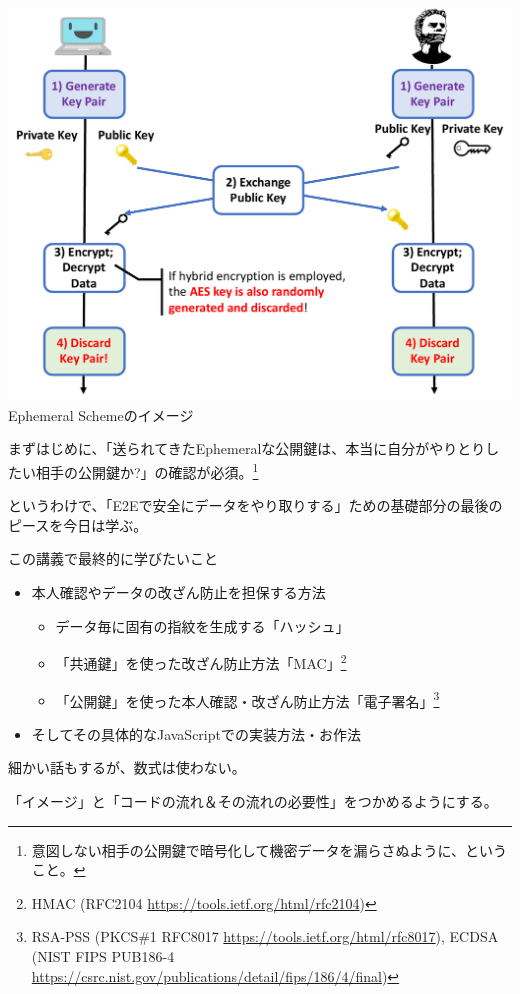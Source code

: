 \documentclass[12pt,dvipdfmx]{beamer}
\begin{document}
\begin{frame}
\small 
\begin{center}
\includegraphics[width=0.7\linewidth]{Figs/ephemeral-scheme-flow01.pdf}\\
Ephemeral Schemeのイメージ
\end{center}
\vspace{-1ex}

まずはじめに、\alert{「送られてきたEphemeralな公開鍵は、本当に自分がやりとりしたい相手の公開鍵か?」の確認}が必須。\footnote[frame]{\scriptsize 意図しない相手の公開鍵で暗号化して機密データを漏らさぬように、ということ。}
\end{frame}

\begin{frame}

というわけで、「E2Eで安全にデータをやり取りする」ための基礎部分の最後のピースを今日は学ぶ。

\begin{block}{\small この講義で最終的に学びたいこと}
\begin{itemize}
\item 本人確認やデータの改ざん防止を担保する方法
\begin{itemize}
 \item データ毎に固有の指紋を生成する「\alert{ハッシュ}」
 \item 「共通鍵」を使った改ざん防止方法「\alert{MAC}」\footnote[frame]{\scriptsize HMAC (RFC2104 \url{https://tools.ietf.org/html/rfc2104})}
 \item 「公開鍵」を使った本人確認・改ざん防止方法「\alert{電子署名}」\footnote[frame]{\scriptsize RSA-PSS (PKCS\#1 RFC8017 \url{https://tools.ietf.org/html/rfc8017}), ECDSA (NIST FIPS PUB186-4 \url{https://csrc.nist.gov/publications/detail/fips/186/4/final})}
\end{itemize}
\item そしてその具体的なJavaScriptでの実装方法・お作法
\end{itemize}
\end{block}

細かい話もするが、数式は使わない。

「イメージ」と「コードの流れ＆その流れの必要性」をつかめるようにする。
\end{frame}
\end{document}
